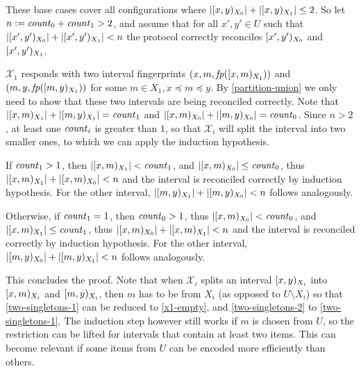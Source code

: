 These base cases cover all configurations where $|{[{x},{y})_{X_0}}| + |{[{x},{y})_{X_1}}| \leq 2$.
So let $n \vcentcolon= \mathit{count}_{0} + \mathit{count}_{1} > 2$, and assume that for all $x', y' \in U$ such that $|{[{x'},{y'})_{X_0}}| + |{[{x'},{y'})_{X_1}}| < n$ the protocol correctly reconciles $[{x'},{y'})_{X_0}$ and $[{x'},{y'})_{X_1}$.

$\mathcal{X}_1$ responds with two interval fingerprints $({x}, {m}, {\mathit{fp}([{x},{m})_{X_1})})$ and $({m}, {y}, {\mathit{fp}([{m},{y})_{X_1})})$ for some $m \in X_1, x \preceq m \preceq y$.
By \cref{partition-union} we only need to show that these two intervals are being reconciled correctly.
Note that $|{[{x},{m})_{X_1}}| + |{[{m},{y})_{X_1}}| = \mathit{count}_{1}$ and $|{[{x},{m})_{X_0}}| + |{[{m},{y})_{X_0}}| = \mathit{count}_{0}$. Since $n > 2$, at least one $\mathit{count}_{i}$ is greater than $1$, so that $\mathcal{X}_i$ will split the interval into two smaller ones, to which we can apply the induction hypothesis.

\begin{caselist}
\case If $\mathit{count}_{1} > 1$, then $|{[{x},{m})_{X_1}}| < \mathit{count}_{1}$, and $|{[{x},{m})_{X_0}}| \leq \mathit{count}_{0}$, thus $|{[{x},{m})_{X_1}}| + |{[{x},{m})_{X_0}}| < n$ and the interval is reconciled correctly by induction hypothesis. For the other interval, $|{[{m},{y})_{X_1}}| + |{[{m},{y})_{X_0}}| < n$ follows analogously.

\case Otherwise, if $\mathit{count}_{1} = 1$, then $\mathit{count}_{0} > 1$, thus $|{[{x},{m})_{X_0}}| < \mathit{count}_{0}$, and $|{[{x},{m})_{X_1}}| \leq \mathit{count}_{1}$, thus $|{[{x},{m})_{X_0}}| + |{[{x},{m})_{X_1}}| < n$ and the interval is reconciled correctly by induction hypothesis. For the other interval, $|{[{m},{y})_{X_0}}| + |{[{m},{y})_{X_1}}| < n$ follows analogously.
\end{caselist}

This concludes the proof. Note that when $\mathcal{X}_i$ splits an interval $[{x},{y})_{X_i}$ into $[{x},{m})_{X_i}$ and $[{m},{y})_{X_i}$, then $m$ has to be from $X_i$ (as opposed to $U \setminus X_i$) so that \cref{two-singletons-1} can be reduced to \cref{x1-empty}, and \cref{two-singletons-2} to \cref{two-singletons-1}. The induction step however still works if $m$ is chosen from $U$, so the restriction can be lifted for intervals that contain at least two items. This can become relevant if some items from $U$ can be encoded more efficiently than others.

